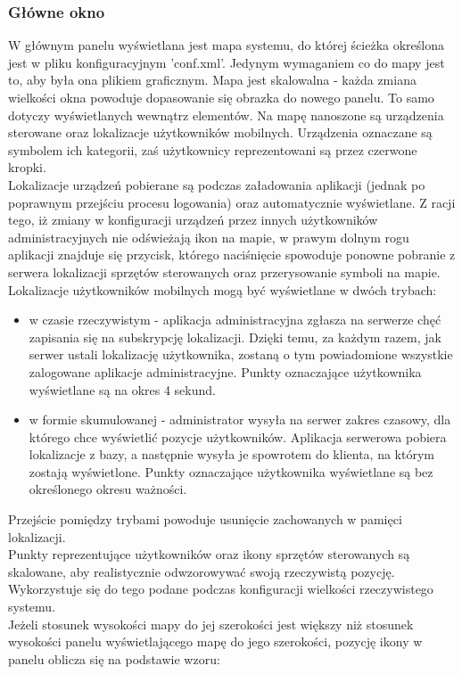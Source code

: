 \subsubsection{Główne okno}
W głównym panelu wyświetlana jest mapa systemu, do której ścieżka określona jest w pliku konfiguracyjnym 'conf.xml'. Jedynym wymaganiem co do mapy jest to, aby była ona plikiem graficznym. Mapa jest skalowalna - każda zmiana wielkości okna powoduje dopasowanie się obrazka do nowego panelu. To samo dotyczy wyświetlanych wewnątrz elementów. Na mapę nanoszone są urządzenia sterowane oraz lokalizacje użytkowników mobilnych. Urządzenia oznaczane są symbolem ich kategorii, zaś użytkownicy reprezentowani są przez czerwone kropki.\\
Lokalizacje urządzeń pobierane są podczas załadowania aplikacji (jednak po poprawnym przejściu procesu logowania) oraz automatycznie wyświetlane. Z racji tego, iż zmiany w konfiguracji urządzeń przez innych użytkowników administracyjnych nie odświeżają ikon na mapie, w prawym dolnym rogu aplikacji znajduje się przycisk, którego naciśnięcie spowoduje ponowne pobranie z serwera lokalizacji sprzętów sterowanych oraz przerysowanie symboli na mapie.\\
Lokalizacje użytkowników mobilnych mogą być wyświetlane w dwóch trybach:
\begin{itemize}
	\item w czasie rzeczywistym - aplikacja administracyjna zgłasza na serwerze chęć zapisania się na subskrypcję lokalizacji. Dzięki temu, za każdym razem, jak serwer ustali lokalizację użytkownika, zostaną o tym powiadomione wszystkie zalogowane aplikacje administracyjne. Punkty oznaczające użytkownika wyświetlane są na okres 4 sekund.
	\item w formie skumulowanej - administrator wysyła na serwer zakres czasowy, dla którego chce wyświetlić pozycje użytkowników. Aplikacja serwerowa pobiera lokalizacje z bazy, a następnie wysyła je spowrotem do klienta, na którym zostają wyświetlone. Punkty oznaczające użytkownika wyświetlane są bez określonego okresu ważności.
\end{itemize}
Przejście pomiędzy trybami powoduje usunięcie zachowanych w pamięci lokalizacji.\\
Punkty reprezentujące użytkowników oraz ikony sprzętów sterowanych są skalowane, aby realistycznie odwzorowywać swoją rzeczywistą pozycję. Wykorzystuje się do tego podane podczas konfiguracji wielkości rzeczywistego systemu.\\
Jeżeli stosunek wysokości mapy do jej szerokości jest większy niż stosunek wysokości panelu wyświetlającego mapę do jego szerokości, pozycję ikony w panelu oblicza się na podstawie wzoru:
